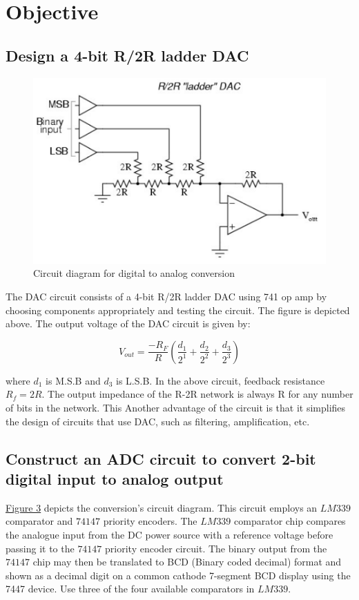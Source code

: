 \section{Objective}
	\subsection{Design a 4-bit R/2R ladder DAC}
		\begin{figure}[H]
			\centering
			\label{obj:1}
			\includegraphics[width=0.6\columnwidth]{images/th1.png}
			\caption{ Circuit diagram for digital to analog conversion }
		\end{figure}
		The DAC circuit consists of a 4-bit R/2R ladder DAC using 741 op amp by choosing components appropriately and testing the circuit. The figure is depicted above. The output voltage of the DAC circuit is given by:
		
		$$V_{out} = \frac{-R_F}{R}\left( \frac{d_1}{2^1} + \frac{d_2}{2^2} + \frac{d_3}{2^3} \right)$$

		where $d_1$ is M.S.B and $d_3$ is L.S.B. In the above circuit, feedback resistance $R_f=2R$. The output impedance of the R-2R network is always R for any number of bits in the network. This Another advantage of the circuit is that it simplifies the design of circuits that use DAC, such as filtering, amplification, etc.

	\subsection{Construct an ADC circuit to convert 2-bit digital input to analog output}
		\hyperref[obj:2]{Figure 3} depicts the conversion's circuit diagram. This circuit employs an $LM339$ comparator and $74147$ priority encoders. The $LM339$ comparator chip compares the analogue input from the DC power source with a reference voltage before passing it to the $74147$ priority encoder circuit. The binary output from the $74147$ chip may then be translated to BCD (Binary coded decimal) format and shown as a decimal digit on a common cathode 7-segment BCD display using the 7447 device. Use three of the four available comparators in $LM339$.
		
